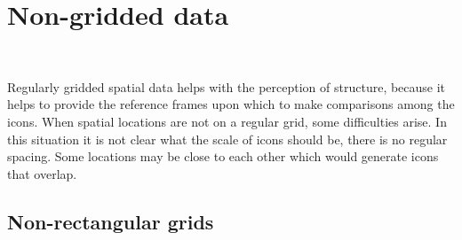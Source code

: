 \documentclass[oneside]{article}
\begin{document}
% 
% 
% 
% 

\section{Non-gridded data}~\label{sec:irregular}

Regularly gridded spatial data helps with the perception of structure, because it helps to provide the reference frames upon which to make comparisons among the icons. When spatial locations are not on a regular grid, some difficulties arise. In this situation it is not clear what the scale of icons should be, there is no regular spacing. Some locations may be close to each other which would generate icons that overlap. 

\subsection{Non-rectangular grids}
\end{document}
